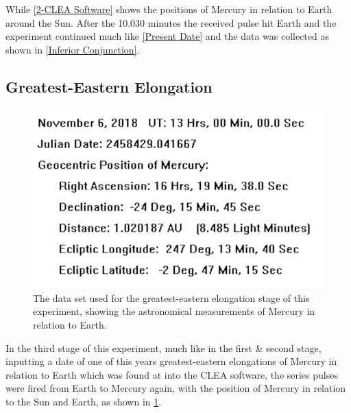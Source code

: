 \documentclass[11pt]{article}
\begin{document}
\begin{multicols}{2}
While \cref{2-CLEA Software} shows the positions of Mercury in relation to Earth around the Sun. After the 10.030 minutes the received pulse hit Earth and the experiment continued much like \cref{Present Date} and the data was collected as shown in \cref{Inferior Conjunction}. 


\subsection{Greatest-Eastern Elongation}

\begin{figure}[H]
\centering
\includegraphics[scale=0.6]{Great-East_Images.png/Data_Set.png}
\caption{The data set used for the greatest-eastern elongation stage of this experiment, showing the astronomical measurements of Mercury in relation to Earth.}
\label{3-Data Set}
\end{figure}

In the third stage of this experiment, much like in the first \& second stage, inputting a date of one of this years greatest-eastern elongations of Mercury in relation to Earth which was found at \cite{astropixels.com} into the CLEA software, the series pulses were fired from Earth to Mercury again, with the position of Mercury in relation to the Sun and Earth, as shown in \cref{3-Data Set}. \\


\end{multicols}
\end{document}
